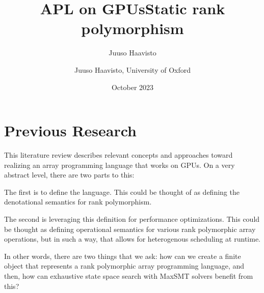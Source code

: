 \documentclass[10pt,a4paper]{article}
\title{APL on GPUs}
\author{Juuso Haavisto}
\date{October 2023}
\begin{document}
\begin{flushleft}
\LARGE\bfseries \makeatletter\@title\makeatother \medskip \par
\Large\mdseries \makeatletter\@author\makeatother \par
\end{flushleft}

\title{Static rank polymorphism}
\author{Juuso Haavisto, University of Oxford}




\section{Previous Research}

This literature review describes relevant concepts and approaches toward realizing an array programming language that works on GPUs.
On a very abstract level, there are two parts to this:

The first is to define the language. This could be thought of as defining the denotational semantics for rank polymorphism.

The second is leveraging this definition for performance optimizations. This could be thought as defining operational semantics for various rank polymorphic array operations, but in such a way, that allows for heterogenous scheduling at runtime.

In other words, there are two things that we ask: how can we create a finite object that represents a rank polymorphic array programming language, and then, how can exhaustive state space search with MaxSMT solvers benefit from this? 
\end{document}

